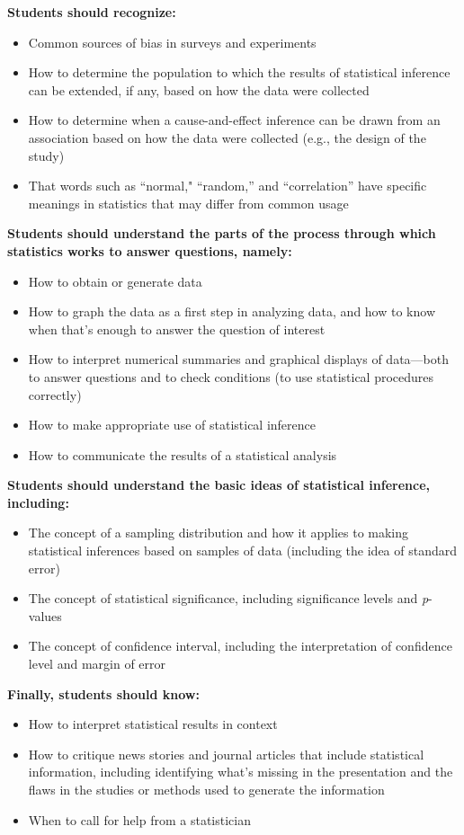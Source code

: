\renewcommand\labelitemi{$\closedsucc$}
\noindent\textbf{Students should recognize:}
\begin{itemize}[leftmargin=1cm, itemsep=.2em]
\item Common sources of bias in surveys and experiments
\item How to determine the population to which the results of statistical inference can be extended, if any, based on how the data were collected
\item How to determine when a cause-and-effect inference can be drawn from an association based on how the data were collected (e.g., the design of the study)
\item That words such as ``normal," ``random,'' and ``correlation'' have specific meanings in statistics that may differ from common usage
\end{itemize}

\noindent\textbf{Students should understand the parts of the process through which statistics works to answer questions, namely:}
\begin{itemize}[leftmargin=1cm, itemsep=.2em]
\item How to obtain or generate data
\item How to graph the data as a first step in analyzing data, and how to know when that's enough to answer the question of interest
\item How to interpret numerical summaries and graphical displays of data---both to answer questions and to check conditions (to use statistical procedures correctly)
\item How to make appropriate use of statistical inference
\item How to communicate the results of a statistical analysis 
\end{itemize}

\noindent\textbf{Students should understand the basic ideas of statistical inference, including:}
\begin{itemize}[leftmargin=1cm, itemsep=.2em]
\item The concept of a sampling distribution and how it applies to making statistical inferences based on samples of data (including the idea of standard error)
\item The concept of statistical significance, including significance levels and \textit{p}-values
\item The concept of confidence interval, including the interpretation of confidence level and margin of error
\end{itemize}

\newpage

\noindent\textbf{Finally, students should know:}
\begin{itemize}[leftmargin=1cm, itemsep=.2em]
\item How to interpret statistical results in context
\item How to critique news stories and journal articles that include statistical information, including identifying what's missing in the presentation and the flaws in the studies or methods used to generate the information
\item When to call for help from a statistician
\end{itemize}


